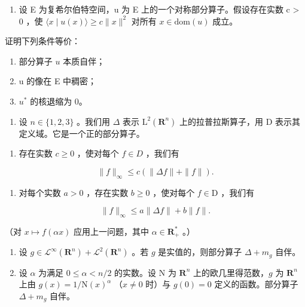 \begin{enumerate}
\def\labelenumi{\arabic{enumi})}
\setcounter{enumi}{12}
\tightlist
\item
  设 E 为复希尔伯特空间，u 为 E 上的一个对称部分算子。假设存在实数 c \textgreater{} 0 ，使 \(\langle x \mid u(x) \rangle \geqslant c \|x\|^{2}\) 对所有 \(x \in \text{dom}(u)\) 成立。
\end{enumerate}

证明下列条件等价：

\begin{enumerate}
\def\labelenumi{(\roman{enumi})}
\item
  部分算子 \(u\) 本质自伴；
\item
  u 的像在 E 中稠密；
\item
  \(u^{*}\) 的核退缩为 0。
\end{enumerate}

\begin{enumerate}
\def\labelenumi{\arabic{enumi})}
\setcounter{enumi}{13}
\tightlist
\item
  设 \(n \in \{1, 2, 3\}\) 。我们用 \(\Delta\) 表示 \(\mathrm{L}^2(\mathbf{R}^n)\) 上的拉普拉斯算子，用 D 表示其定义域。它是一个正的部分算子。
\end{enumerate}

\begin{enumerate}
\def\labelenumi{\alph{enumi})}
\tightlist
\item
  存在实数 \(c \geqslant 0\) ，使对每个 \(f \in D\) ，我们有
\end{enumerate}

\[
\| f \| _ {\infty} \leqslant c (\| \Delta f \| + \| f \|).
\]

\begin{enumerate}
\def\labelenumi{\alph{enumi})}
\setcounter{enumi}{1}
\tightlist
\item
  对每个实数 \(a > 0\) ，存在实数 \(b \geqslant 0\) ，使对每个 \(f \in \mathrm{D}\) ，我们有
\end{enumerate}

\[
\| f \| _ {\infty} \leqslant a \| \Delta f \| + b \| f \|.
\]

（对 \(x \mapsto f(\alpha x)\) 应用上一问题，其中 \(\alpha \in \mathbf{R}_{+}^{*}\) 。）

\begin{enumerate}
\def\labelenumi{\alph{enumi})}
\setcounter{enumi}{2}
\item
  设 \(g \in \mathcal{L}^{\infty}(\mathbf{R}^{n}) + \mathcal{L}^{2}(\mathbf{R}^{n})\) 。若 \(g\) 是实值的，则部分算子 \(\Delta + m_{g}\) 自伴。
\item
  设 \(\alpha\) 为满足 \(0 \leqslant \alpha < n/2\) 的实数。设 N 为 \(\mathbf{R}^n\) 上的欧几里得范数，\(g\) 为 \(\mathbf{R}^n\) 上由 \(g(x) = 1/\mathrm{N}(x)^\alpha\) （\(x \neq 0\) 时）与 \(g(0) = 0\) 定义的函数。部分算子 \(\Delta + m_g\) 自伴。
\end{enumerate}

